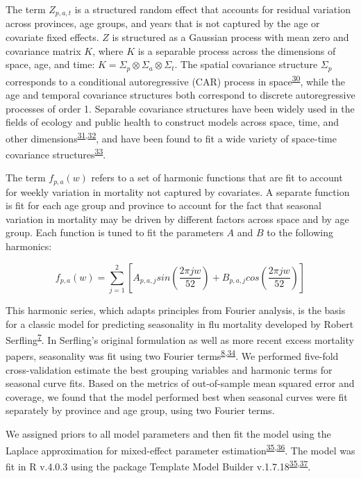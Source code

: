\documentclass[
]{article}
\begin{document}
The term \(Z_{p,a,t}\) is a structured random effect that accounts for residual variation across provinces, age groups, and years that is not captured by the age or covariate fixed effects. \(Z\) is structured as a Gaussian process with mean zero and covariance matrix \(K\), where \(K\) is a separable process across the dimensions of space, age, and time: \(K = \Sigma_p \otimes \Sigma_a \otimes \Sigma_t\). The spatial covariance structure \(\Sigma_p\) corresponds to a conditional autoregressive (CAR) process in space\textsuperscript{\protect\hyperlink{ref-Riebler2016}{30}}, while the age and temporal covariance structures both correspond to discrete autoregressive processes of order 1. Separable covariance structures have been widely used in the fields of ecology and public health to construct models across space, time, and other dimensions\textsuperscript{\protect\hyperlink{ref-Thorson2017}{31},\protect\hyperlink{ref-Wakefield2019}{32}}⁠, and have been found to fit a wide variety of space-time covariance structures\textsuperscript{\protect\hyperlink{ref-Huang2007}{33}}.

The term \(f_{p,a}(w)\) refers to a set of harmonic functions that are fit to account for weekly variation in mortality not captured by covariates. A separate function is fit for each age group and province to account for the fact that seasonal variation in mortality may be driven by different factors across space and by age group. Each function is tuned to fit the parameters \(A\) and \(B\) to the following harmonics:

\[f_{p,a}(w) = \sum_{j=1}^{2}[A_{p,a,j}sin(\frac{2\pi j w}{52}) + B_{p,a,j}cos(\frac{2\pi j w}{52})]\]

This harmonic series, which adapts principles from Fourier analysis, is the basis for a classic model for predicting seasonality in flu mortality developed by Robert Serfling\textsuperscript{\protect\hyperlink{ref-Serfling1963}{7}}⁠. In Serfling's original formulation as well as more recent excess mortality papers, seasonality was fit using two Fourier terms\textsuperscript{\protect\hyperlink{ref-Weinberger2020a}{8},\protect\hyperlink{ref-Woolf2020}{34}}⁠. We performed five-fold cross-validation estimate the best grouping variables and harmonic terms for seasonal curve fits. Based on the metrics of out-of-sample mean squared error and coverage, we found that the model performed best when seasonal curves were fit separately by province and age group, using two Fourier terms.

We assigned priors to all model parameters and then fit the model using the Laplace approximation for mixed-effect parameter estimation\textsuperscript{\protect\hyperlink{ref-Kristensen2016}{35},\protect\hyperlink{ref-Thorson2016}{36}}⁠. The model was fit in R v.4.0.3 using the package Template Model Builder v.1.7.18\textsuperscript{\protect\hyperlink{ref-Kristensen2016}{35},\protect\hyperlink{ref-RCoreTeam2018}{37}}.
\end{document}
